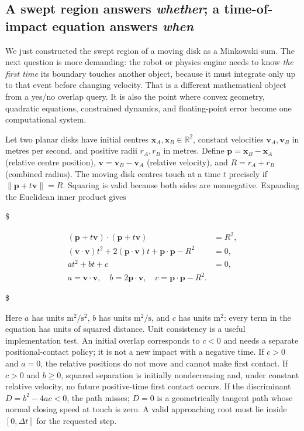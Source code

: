 \subsection{\texorpdfstring{A swept region answers \emph{whether}; a time-of-impact equation answers \emph{when}}{A swept region answers whether; a time-of-impact equation answers when}}\label{01-foundations-i-ch018-a-swept-region-answers-whether-a-time-of-impact-equation-answers-when}

We just constructed the swept region of a moving disk as a Minkowski sum. The next question is more demanding: the robot or physics engine needs to know \emph{the first time} its boundary touches another object, because it must integrate only up to that event before changing velocity. That is a different mathematical object from a yes/no overlap query. It is also the point where convex geometry, quadratic equations, constrained dynamics, and floating-point error become one computational system.

Let two planar disks have initial centres \(\mathbf x_A,\mathbf x_B\in\mathbb R^2\), constant velocities \(\mathbf v_A,\mathbf v_B\) in metres per second, and positive radii \(r_A,r_B\) in metres. Define \(\mathbf p=\mathbf x_B-\mathbf x_A\) (relative centre position), \(\mathbf v=\mathbf v_B-\mathbf v_A\) (relative velocity), and \(R=r_A+r_B\) (combined radius). The moving disk centres touch at a time \(t\) precisely if \(\|\mathbf p+t\mathbf v\|=R\). Squaring is valid because both sides are nonnegative. Expanding the Euclidean inner product gives

\$

\[\begin{aligned}
(\mathbf p+t\mathbf v)\cdot(\mathbf p+t\mathbf v)&=R^2,\\
(\mathbf v\cdot\mathbf v)t^2+2(\mathbf p\cdot\mathbf v)t
+\mathbf p\cdot\mathbf p-R^2&=0,\\
at^2+bt+c&=0,\\
a=\mathbf v\cdot\mathbf v,\quad
b=2\mathbf p\cdot\mathbf v,\quad
c=\mathbf p\cdot\mathbf p-R^2.&
\end{aligned}\]

\$

Here \(a\) has units \(\mathrm{m}^2/\mathrm{s}^2\), \(b\) has units \(\mathrm{m}^2/\mathrm{s}\), and \(c\) has units \(\mathrm{m}^2\): every term in the equation has units of squared distance. Unit consistency is a useful implementation test. An initial overlap corresponds to \(c<0\) and needs a separate positional-contact policy; it is not a new impact with a negative time. If \(c>0\) and \(a=0\), the relative positions do not move and cannot make first contact. If \(c>0\) and \(b\ge0\), squared separation is initially nondecreasing and, under constant relative velocity, no future positive-time first contact occurs. If the discriminant \(D=b^2-4ac<0\), the path misses; \(D=0\) is a geometrically tangent path whose normal closing speed at touch is zero. A valid approaching root must lie inside \([0,\Delta t]\) for the requested step.

